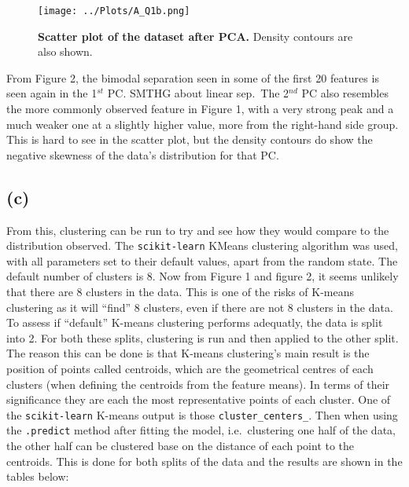 \documentclass[12pt]{report} %
\begin{document}
\begin{figure}[h]
    \centering
    \texttt{[image: ../Plots/A\_Q1b.png]}
    \caption{\textbf{Scatter plot of the dataset after PCA.} Density contours are also shown.}
\end{figure}

From Figure 2, the bimodal separation seen in some of the first 20 features is seen again in the 1$^{st}$ PC. SMTHG about linear sep.\ The 2$^{nd}$ PC also resembles the more commonly observed feature in Figure 1, with a very strong peak and a much weaker one at a slightly higher value, more from the right-hand side group. This is hard to see in the scatter plot, but the density contours do show the negative skewness of the data's distribution for that PC.\

\subsection*{(c)}

From this, clustering can be run to try and see how they would compare to the distribution observed. The \texttt{scikit-learn} KMeans clustering algorithm was used, with all parameters set to their default values, apart from the random state.
The default number of clusters is 8. Now from Figure 1 and figure 2, it seems unlikely that there are 8 clusters in the data. This is one of the risks of K-means clustering as it will ``find'' 8 clusters, even if there are not 8 clusters in the data. To assess if ``default'' K-means clustering performs adequatly, the data is split into 2. For both these splits, clustering is run and then applied to the other split.  
The reason this can be done is that K-means clustering's main result is the position of points called centroids, which are the geometrical centres of each clusters (when defining the centroids from the feature means). In terms of their significance they are each the most representative points of each cluster\cite[p. 243]{sklearn_book}. One of the \texttt{scikit-learn} K-means output is those \texttt{cluster\_centers\_}. Then when using the \texttt{.predict{}} method after fitting the model, i.e.\ clustering one half of the data, the other half can be clustered base on the distance of each point to the centroids. This is done for both splits of the data and the results are shown in the tables below:
\end{document}
